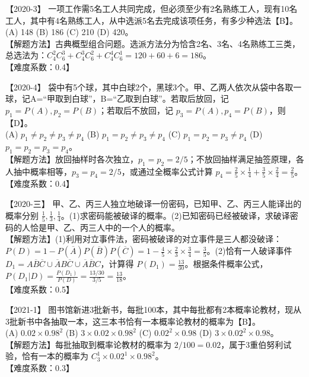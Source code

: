 \documentclass[zihao=4, a4paper, fontset=mac]{ctexart}
\begin{document}
【2020-3】 一项工作需5名工人共同完成，但必须至少有2名熟练工人，现有10名工人，其中有4名熟练工人，从中选派5名去完成该项任务，有多少种选法【B】。\\
(A) 148 \quad (B) 186 \quad (C) 210 \quad (D) 420。\\
【解题方法】古典概型组合问题。选派方法分为恰含2名、3名、4名熟练工三类，总选法为：$C_4^2C_6^3 + C_4^3C_6^2 + C_4^4C_6^1 = 120 + 60 + 6 = 186$。\\
【难度系数：0.4】

\par\vspace{\baselineskip}

【2020-4】 袋中有5个球，其中白球2个，黑球3个。甲、乙两人依次从袋中各取一球，记A=“甲取到白球”，B=“乙取到白球”。若取后放回，记 $p_1=P(A), p_2=P(B)$；若取后不放回，记 $p_3=P(A), p_4=P(B)$，则【D】。\\
(A) $p_1\ne p_2\ne p_3\ne p_4$ \quad (B) $p_1=p_2\ne p_3\ne p_4$ \quad (C) $p_1=p_2=p_3\ne p_4$ \quad (D) $p_1=p_2=p_3=p_4$。\\
【解题方法】放回抽样时各次独立，$p_1=p_2=2/5$；不放回抽样满足抽签原理，各人抽中概率相等，$p_3=p_4=2/5$，或通过全概率公式计算 $p_4 = \frac{2}{5}\times\frac{1}{4} + \frac{3}{5}\times\frac{2}{4} = \frac{2}{5}$。\\
【难度系数：0.4】

\par\vspace{\baselineskip}

【2020-三】 甲、乙、丙三人独立地破译一份密码，已知甲、乙、丙三人能译出的概率分别 $\frac{1}{5},\frac{1}{3},\frac{1}{4}$。(1)求密码能被破译的概率。(2)已知密码已经被破译，求破译密码的人恰是甲、乙、丙三人中的一个人的概率。\\
【解题方法】(1)利用对立事件法，密码被破译的对立事件是三人都没破译：$P(D) = 1 - P(\overline{A})P(\overline{B})P(\overline{C}) = 1 - \frac{4}{5}\times\frac{2}{3}\times\frac{3}{4} = \frac{3}{5}$。(2)恰有一人破译事件 $D_1 = A\overline{B}\overline{C}\cup\overline{A}B\overline{C}\cup\overline{A}\overline{B}C$，计算得 $P(D_1) = \frac{13}{30}$。根据条件概率公式，$P(D_1|D) = \frac{P(D_1)}{P(D)} = \frac{13/30}{3/5} = \frac{13}{18}$。\\
【难度系数：0.5】

\par\vspace{\baselineskip}

【2021-1】 图书馆新进3批新书，每批100本，其中每批都有2本概率论教材，现从3批新书中各抽取一本，这三本书恰有一本概率论教材的概率为【B】。\\
(A) $0.02\times0.98^2$ \quad (B) $3\times0.02\times0.98^2$ \quad (C) $0.02^2\times0.98$ \quad (D) $3\times0.02^2\times0.98$。\\
【解题方法】每批抽取到概率论教材的概率为 $2/100 = 0.02$，属于3重伯努利试验，恰有一本的概率为 $C_3^1 \times 0.02^1 \times 0.98^2$。\\
【难度系数：0.3】
\end{document}
